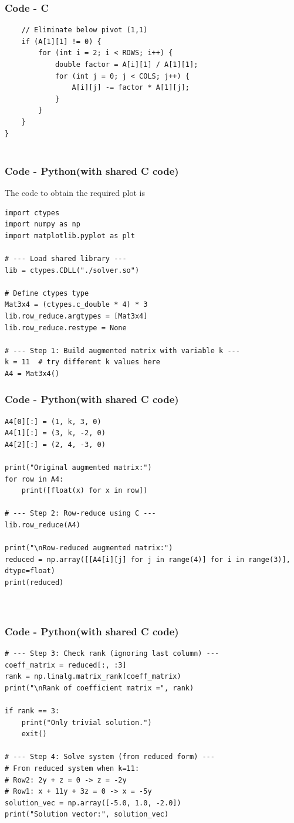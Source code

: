 \documentclass{beamer}
\theoremstyle{remark}
\numberwithin{equation}{section}
\begin{document}
    \begin{frame}[fragile]
    \frametitle{Code - C}
    \begin{lstlisting}
    // Eliminate below pivot (1,1)
    if (A[1][1] != 0) {
        for (int i = 2; i < ROWS; i++) {
            double factor = A[i][1] / A[1][1];
            for (int j = 0; j < COLS; j++) {
                A[i][j] -= factor * A[1][j];
            }
        }
    }
}


\end{lstlisting}
\end{frame}

\begin{frame}[fragile]
    \frametitle{Code - Python(with shared C code)}
    The code to obtain the required plot is
    \begin{lstlisting}
import ctypes
import numpy as np
import matplotlib.pyplot as plt

# --- Load shared library ---
lib = ctypes.CDLL("./solver.so")

# Define ctypes type
Mat3x4 = (ctypes.c_double * 4) * 3
lib.row_reduce.argtypes = [Mat3x4]
lib.row_reduce.restype = None

# --- Step 1: Build augmented matrix with variable k ---
k = 11  # try different k values here
A4 = Mat3x4()
\end{lstlisting}
\end{frame}
\begin{frame}[fragile]
\frametitle{Code - Python(with shared C code)}
\begin{lstlisting}
A4[0][:] = (1, k, 3, 0)
A4[1][:] = (3, k, -2, 0)
A4[2][:] = (2, 4, -3, 0)

print("Original augmented matrix:")
for row in A4:
    print([float(x) for x in row])

# --- Step 2: Row-reduce using C ---
lib.row_reduce(A4)

print("\nRow-reduced augmented matrix:")
reduced = np.array([[A4[i][j] for j in range(4)] for i in range(3)], dtype=float)
print(reduced)



\end{lstlisting}
\end{frame}

\begin{frame}[fragile]
\frametitle{Code - Python(with shared C code)}
\begin{lstlisting}
# --- Step 3: Check rank (ignoring last column) ---
coeff_matrix = reduced[:, :3]
rank = np.linalg.matrix_rank(coeff_matrix)
print("\nRank of coefficient matrix =", rank)

if rank == 3:
    print("Only trivial solution.")
    exit()

# --- Step 4: Solve system (from reduced form) ---
# From reduced system when k=11:
# Row2: 2y + z = 0 -> z = -2y
# Row1: x + 11y + 3z = 0 -> x = -5y
solution_vec = np.array([-5.0, 1.0, -2.0])
print("Solution vector:", solution_vec)


\end{lstlisting}
\end{frame}
\end{document}

